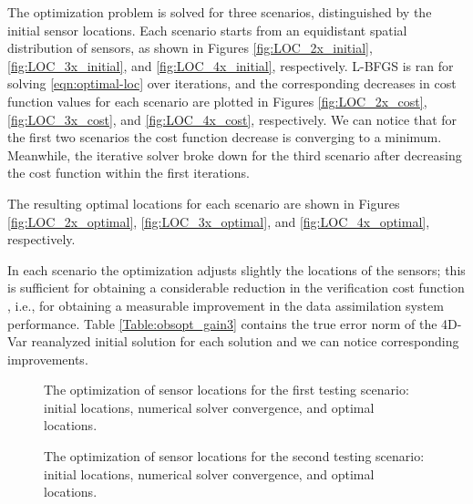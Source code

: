 \documentclass{article}
\begin{document}
The optimization problem is solved for three scenarios, distinguished by the initial sensor locations.
Each scenario starts from an equidistant spatial distribution of sensors, as shown in 
Figures \ref{fig:LOC_2x_initial}, \ref{fig:LOC_3x_initial}, and \ref{fig:LOC_4x_initial}, respectively.
L-BFGS is ran for solving \eqref{eqn:optimal-loc} over  iterations, and the corresponding 
decreases in cost function values for each scenario are plotted in 
Figures \ref{fig:LOC_2x_cost}, \ref{fig:LOC_3x_cost}, and \ref{fig:LOC_4x_cost}, respectively.
We can notice that for the first two scenarios the cost function decrease is converging to a minimum.
Meanwhile, the iterative solver broke down for the third scenario after decreasing the cost function within the first  iterations.

The resulting optimal locations for each scenario are shown in 
Figures \ref{fig:LOC_2x_optimal}, \ref{fig:LOC_3x_optimal}, and \ref{fig:LOC_4x_optimal}, respectively. 

In each scenario the optimization adjusts slightly the locations of the sensors; this is sufficient
for obtaining a considerable reduction in the verification cost function , i.e.,
for obtaining a measurable improvement in the data assimilation system performance.
Table \ref{Table:obsopt_gain3} contains the true error norm of the 4D-Var reanalyzed initial solution
for each solution and we can notice corresponding improvements.



\begin{figure}
\setcounter{subfigure}{0}
\centering
\caption{The optimization of sensor locations for the first testing scenario: initial locations, numerical solver convergence, and optimal locations.}
\end{figure}

\begin{figure}
\setcounter{subfigure}{0}
\centering
\caption{The optimization of sensor locations for the second testing scenario: initial locations, numerical solver convergence, and optimal locations.}
\end{figure}
 
\end{document}
